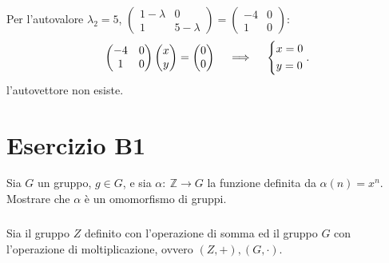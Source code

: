 \documentclass[a4paper]{report}
\newenvironment{problem}
        {
                \begin{mdframed}[topline=false,rightline=false,bottomline=false]
                        \slshape
        }
        {
                \end{mdframed}
        }
\begin{document}
        \paragraph{}
        Per l'autovalore $ \lambda_2 = 5 $,
        $
                \begin{pmatrix}
                        1 - \lambda & 0 \\
                        1 & 5 - \lambda
                \end{pmatrix} = \begin{pmatrix}
                        -4 & 0 \\
                        1 & 0
                \end{pmatrix}
        $:
        \[
                \begin{pmatrix}
                        -4 & 0 \\
                        1 & 0
                \end{pmatrix}\begin{pmatrix}
                        x \\
                        y
                \end{pmatrix} = \begin{pmatrix}
                        0 \\
                        0
                \end{pmatrix} \quad \implies \quad
                \begin{dcases}
                        x  = 0 \\
                        y = 0
                \end{dcases}.
        \]
        l'autovettore non esiste.


        \chapter*{Esercizio B1}
        \begin{problem}
                Sia $G$ un gruppo, $ g \in G $, e sia $ \alpha\!:\ \mathbb{Z} \to G $ la funzione
                definita da $ \alpha(n) = x^n $. Mostrare che $\alpha$ \`{e} un omomorfismo di gruppi.
        \end{problem}

        \paragraph{}
        Sia il gruppo $Z$ definito con l'operazione di somma ed il gruppo $G$ con l'operazione di moltiplicazione,
        ovvero $(Z,+), (G,\cdot)$.
\end{document}
